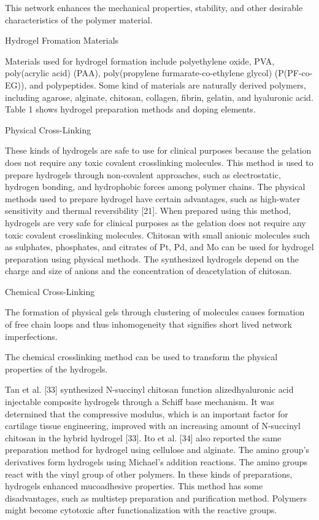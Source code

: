 \documentclass[../../main-notes.tex]{subfiles}
\begin{document}
This network enhances the mechanical properties, stability, and other desirable characteristics of the polymer material. 

Hydrogel Fromation Materials

Materials used for hydrogel formation include polyethylene oxide, PVA, poly(acrylic acid) (PAA), poly(propylene furmarate-co-ethylene glycol) (P(PF-co-EG)), and polypeptides. 
Some kind of materials are naturally derived polymers, including agarose, alginate, chitosan, collagen, fibrin, gelatin, and hyaluronic acid. 
Table 1 shows hydrogel preparation methods and doping elements.

Physical Cross-Linking

These kinds of hydrogels are safe to use for clinical purposes because the gelation does not require any toxic covalent crosslinking molecules. 
This method is used to prepare hydrogels through non-covalent approaches, such as electrostatic, hydrogen bonding, and hydrophobic forces among polymer chains. 
The physical methods used to prepare hydrogel have certain advantages, such as high-water sensitivity and thermal reversibility [21]. 
When prepared using this method, hydrogels are very safe for clinical purposes as the gelation does not require any toxic covalent crosslinking molecules. 
Chitosan with small anionic molecules such as sulphates, phosphates, and citrates of Pt, Pd, and Mo can be used for hydrogel preparation using physical methods. 
The synthesized hydrogels depend on the charge and size of anions and the concentration of deacetylation of chitosan.


Chemical Cross-Linking

The formation of physical gels through clustering of molecules causes formation of free chain loops and thus inhomogeneity that signifies short lived network imperfections. 

The chemical crosslinking method can be used to transform the physical properties of the hydrogels. 

 
Tan et al. [33] synthesized N-succinyl chitosan function alizedhyaluronic acid injectable composite hydrogels through a Schiff base mechanism. 
It was determined that the compressive modulus, which is an important factor for cartilage tissue engineering, improved with an increasing amount of N-succinyl chitosan in the hybrid hydrogel [33]. 
Ito et al. [34] also reported the same preparation method for hydrogel using cellulose and alginate. The amino group’s derivatives form hydrogels using Michael’s addition reactions. 
The amino groups react with the vinyl group of other polymers. 
In these kinds of preparations, hydrogels enhanced mucoadhesive properties. This method has some disadvantages, such as multistep preparation and purification method. Polymers might become cytotoxic after functionalization with the reactive groups.
\end{document}
